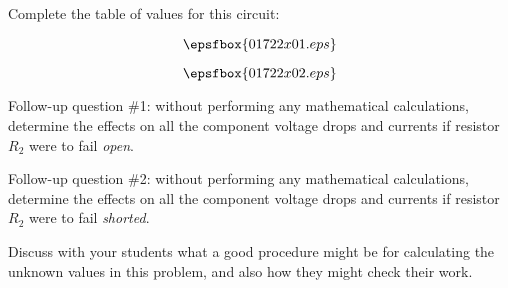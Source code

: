 

Complete the table of values for this circuit:

$$\epsfbox{01722x01.eps}$$







$$\epsfbox{01722x02.eps}$$

\vskip 10pt

Follow-up question \#1: without performing any mathematical calculations, determine the effects on all the component voltage drops and currents if resistor $R_2$ were to fail {\it open}.

\vskip 10pt

Follow-up question \#2: without performing any mathematical calculations, determine the effects on all the component voltage drops and currents if resistor $R_2$ were to fail {\it shorted}.







Discuss with your students what a good procedure might be for calculating the unknown values in this problem, and also how they might check their work.




